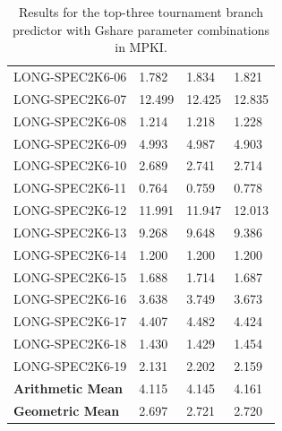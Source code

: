 \documentclass{article}
\begin{document}
\begin{table}[h]
\begin{tabular}{llll}
        LONG-SPEC2K6-06  & 1.782 & 1.834 & 1.821 \\
        LONG-SPEC2K6-07  & 12.499 & 12.425 & 12.835 \\
        LONG-SPEC2K6-08  & 1.214 & 1.218 & 1.228 \\
        LONG-SPEC2K6-09  & 4.993 & 4.987 & 4.903 \\
        LONG-SPEC2K6-10  & 2.689 & 2.741 & 2.714 \\
        LONG-SPEC2K6-11  & 0.764 & 0.759 & 0.778 \\
        LONG-SPEC2K6-12  & 11.991 & 11.947 & 12.013 \\
        LONG-SPEC2K6-13  & 9.268 & 9.648 & 9.386 \\
        LONG-SPEC2K6-14  & 1.200 & 1.200 & 1.200 \\
        LONG-SPEC2K6-15  & 1.688 & 1.714 & 1.687 \\
        LONG-SPEC2K6-16  & 3.638 & 3.749 & 3.673 \\
        LONG-SPEC2K6-17  & 4.407 & 4.482 & 4.424 \\
        LONG-SPEC2K6-18  & 1.430 & 1.429 & 1.454 \\
        LONG-SPEC2K6-19  & 2.131 & 2.202 & 2.159 \\
        \midrule
        \textbf{Arithmetic Mean} & 4.115 & 4.145 & 4.161 \\
        \textbf{Geometric Mean} & 2.697 & 2.721 & 2.720 \\
        \bottomrule
    \end{tabular}
    \caption{Results for the top-three tournament branch predictor with Gshare parameter combinations in MPKI.}
    \label{tab:tbp_gshare_res}
\end{table}
\end{document}
